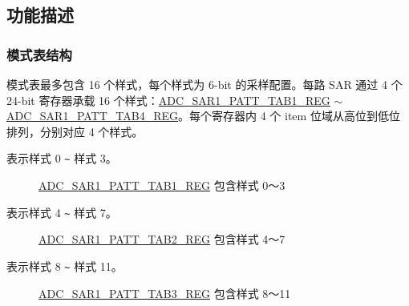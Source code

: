 \documentclass[main\_\_CN.tex]{subfiles}
\begin{document}
\subsection{功能描述}
\label{sec:adc-pattern-func-descr}

\subsubsection{模式表结构}
\label{sec:adc-pattern-tab}
模式表最多包含 16 个样式，每个样式为 6-bit 的采样配置。每路 SAR 通过 4 个 24-bit 寄存器承载 16 个样式：\hyperref[regdesc:ADCSAR1PATTTAB1REG]{ADC\_SAR1\_PATT\_TAB1\_REG} $\sim$ \hyperref[regdesc:ADCSAR1PATTTAB4REG]{ADC\_SAR1\_PATT\_TAB4\_REG}。每个寄存器内 4 个 item 位域从高位到低位排列，分别对应 4 个样式。

%
%
%
%
\begin{regdesc}\begin{reglist}
\item [item \regindex{x}] 表示样式 0 \verb+~+ 样式 3。
\end{reglist}\end{regdesc}
\vspace{-2em}
\begin{figure}[H]
    \centering
    \caption{\hyperref[regdesc:ADCSAR1PATTTAB1REG]{ADC\_SAR1\_PATT\_TAB1\_REG} 包含样式 0～3}
    \label{fig:adc-sar1-patt-tab1-reg-entry0-entry3}
\end{figure}

%
%
%
%
\begin{regdesc}\begin{reglist}
\item [item \regindex{x}] 表示样式 4 \verb+~+ 样式 7。
\end{reglist}\end{regdesc}
\vspace{-2em}
\begin{figure}[H]
    \centering
    \caption{\hyperref[regdesc:ADCSAR1PATTTAB2REG]{ADC\_SAR1\_PATT\_TAB2\_REG} 包含样式 4～7}
    \label{fig:adc-sar1-patt-tab2-reg-entry4-entry7}
\end{figure}

%
%
%
%
\begin{regdesc}\begin{reglist}
\item [item \regindex{x}] 表示样式 8 \verb+~+ 样式 11。
\end{reglist}\end{regdesc}
\vspace{-2em}
\begin{figure}[H]
    \centering
    \caption{\hyperref[regdesc:ADCSAR1PATTTAB3REG]{ADC\_SAR1\_PATT\_TAB3\_REG} 包含样式 8～11}
    \label{fig:adc-sar1-patt-tab3-reg-entry8-entry11}
\end{figure}
\end{document}
